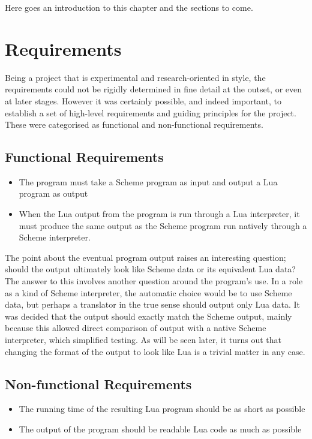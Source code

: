 Here goes an introduction to this chapter and the sections to come.


\section{Requirements}

Being a project that is experimental and research-oriented in style, the
requirements could not be rigidly determined in fine detail at the outset, or
even at later stages. However it was certainly possible, and indeed important,
to establish a set of high-level requirements and guiding principles for the
project. These were categorised as functional and non-functional requirements.

\subsection{Functional Requirements}

\begin{itemize}
\item The program must take a Scheme program as input and output a Lua program
as output
\item When the Lua output from the program is run through a Lua interpreter, it
must produce the same output as the Scheme program run natively through a Scheme
interpreter.
\end{itemize}

The point about the eventual program output raises an interesting question;
should the output ultimately look like Scheme data or its equivalent Lua data?
The answer to this involves another question around the program's use. In a role
as a kind of Scheme interpreter, the automatic choice would be to use Scheme
data, but perhaps a translator in the true sense should output only Lua data.
It was decided that the output should exactly match the Scheme output, mainly
because this allowed direct comparison of output with a native Scheme
interpreter, which simplified testing. As will be seen later, it turns out that
changing the format of the output to look like Lua is a trivial matter in any
case.

\subsection{Non-functional Requirements}

\begin{itemize}
\item The running time of the resulting Lua program should be as short as
possible
\item The output of the program should be readable Lua code as much as possible
\end{itemize}

